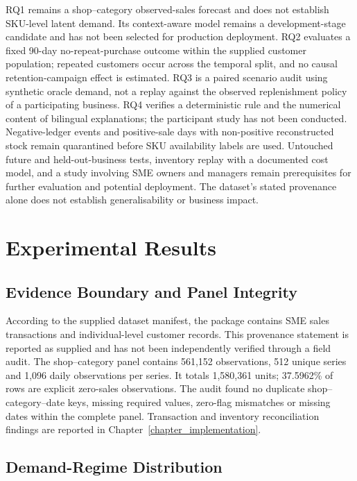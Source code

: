\documentclass[a4paper,11pt,oneside]{book}
\makeatletter
\def\cleardoublepage{\clearpage\if@twoside \ifodd\c@page\else
\hbox{}
\thispagestyle{empty}
\newpage
\if@twocolumn\hbox{}\newpage\fi\fi\fi}
\theoremstyle{plain}
\theoremstyle{definition}
\theoremstyle{remark}
\makeatother
\begin{document}
RQ1 remains a shop--category observed-sales forecast and does not establish
SKU-level latent demand. Its context-aware model remains a development-stage candidate and has not
been selected for production deployment. RQ2 evaluates a fixed 90-day no-repeat-purchase
outcome within the supplied customer population; repeated customers occur
across the temporal split, and no causal retention-campaign effect is
estimated. RQ3 is a paired scenario audit using synthetic oracle demand,
not a replay against the observed replenishment policy of a participating business. RQ4 verifies a deterministic
rule and the numerical content of bilingual explanations; the participant
study has not been conducted. Negative-ledger events and positive-sale days
with non-positive reconstructed stock remain quarantined before SKU
availability labels are used. Untouched future and held-out-business tests,
inventory replay with a documented cost model, and a study involving SME
owners and managers remain prerequisites for further evaluation and potential deployment. The dataset's stated provenance alone does not establish
generalisability or business impact.

\cleardoublepage
\chapter{Experimental Results}
\label{chapter_experimentalResults}

\section{Evidence Boundary and Panel Integrity}

According to the supplied dataset manifest, the package contains SME sales
transactions and individual-level customer records. This provenance statement
is reported as supplied and has not been independently verified through a
field audit. The shop--category panel contains 561,152 observations, 512 unique
series and 1,096 daily observations per series. It totals 1,580,361 units;
37.5962\% of rows are explicit zero-sales observations. The audit found no
duplicate shop--category--date keys, missing required values, zero-flag
mismatches or missing dates within the complete panel. Transaction and
inventory reconciliation findings are reported in Chapter~\ref{chapter_implementation}.

\section{Demand-Regime Distribution}
\end{document}
